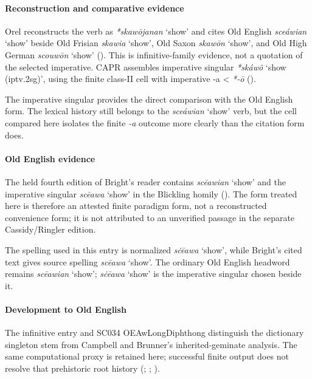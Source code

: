 \documentclass[
  british,
  a4paper,
]{article}
\providecommand{\Recon}[1]{\emph{*#1}}
\begin{document}
\paragraph{Reconstruction and comparative
evidence}\label{reconstruction-and-comparative-evidence-144}

Orel reconstructs the verb as \Recon{skawōjanan} `show' and cites Old
English \emph{sceáwian} `show' beside Old Frisian \emph{skawia} `show',
Old Saxon \emph{skawōn} `show', and Old High German \emph{scouwōn}
`show' (). This is
infinitive-family evidence, not a quotation of the selected imperative.
CAPR assembles imperative singular \Recon{skáwô} `show (iptv.2sg)',
using the finite class-II cell with imperative -a \textless{} \emph{*-ō}
().

The imperative singular provides the direct comparison with the Old
English form. The lexical history still belongs to the \emph{sceáwian}
`show' verb, but the cell compared here isolates the finite \emph{-a}
outcome more clearly than the citation form does.

\paragraph{Old English evidence}\label{old-english-evidence-146}

The held fourth edition of Bright's reader contains \emph{scēawian}
`show' and the imperative singular \emph{scēawa} `show' in the Blickling
homily (). The form treated
here is therefore an attested finite paradigm form, not a reconstructed
convenience form; it is not attributed to an unverified passage in the
separate Cassidy/Ringler edition.

The spelling used in this entry is normalized \emph{sċēawa} `show',
while Bright's cited text gives source spelling \emph{scēawa} `show'.
The ordinary Old English headword remains \emph{scēawian} `show';
\emph{sċēawa} `show' is the imperative singular chosen beside it.

\paragraph{Development to Old
English}\label{development-to-old-english-145}

The infinitive entry and SC034 OEAwLongDiphthong distinguish the
dictionary singleton stem from Campbell and Brunner's inherited-geminate
analysis. The same computational proxy is retained here; successful
finite output does not resolve that prehistoric root history
(;
;
).
\end{document}
